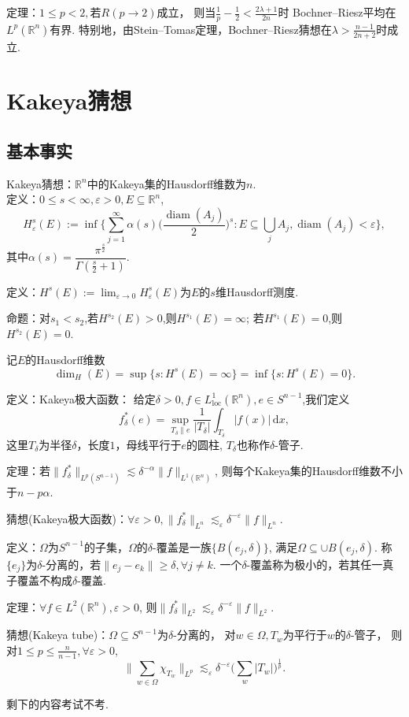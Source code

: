 定理：$1\leq p<2,$若$R(p\to 2)$成立，
则当$\frac{1}{p}-\frac{1}{2}<\frac{2\lambda+1}{2n}$时
Bochner--Riesz平均在$L^p(\mathbb{R}^n)$有界.
特别地，由Stein--Tomas定理，Bochner--Riesz猜想在$\lambda>\frac{n-1}{2n+2}$时成立.


\section{Kakeya猜想}

\subsection{基本事实}

Kakeya猜想：$\mathbb{R}^n$中的Kakeya集的Hausdorff维数为$n$.\\

定义：$0\leq s<\infty,\varepsilon >0,E \subseteq \mathbb{R}^n$,
$$H^s_\varepsilon(E)
:=\inf \bigg\{\sum_{j=1}^\infty \alpha(s)
\Big(\frac{\operatorname{diam}(A_j)}{2}\Big)^s :
E \subseteq \bigcup_{j}A_j,\operatorname{diam}(A_j)<\varepsilon\bigg\},$$
其中$\alpha(s)=\dfrac{\pi^\frac{s}{2}}{\Gamma(\frac{s}{2}+1)}$.

定义：$H^s(E):=\lim_{\varepsilon \to 0}H^s_\varepsilon (E)$为$E$的$s$维Hausdorff测度.

命题：对$s_1<s_2$,若$H^{s_2}(E)>0$,则$H^{s_1}(E)=\infty$;
若$H^{s_1}(E)=0$,则$H^{s_2}(E)=0$.

记$E$的Hausdorff维数$$\dim_{H}(E)=\sup\{s:H^s(E)=\infty\}=\inf \{ s:H^s(E)=0 \}.$$

定义：Kakeya极大函数：
给定$\delta>0,f\in L^1_{\text{loc}}(\mathbb{R}^n),e\in S^{n-1}$,我们定义
$$f^*_\delta(e)=\sup_{T_\delta\parallel e}\frac{1}{|T_\delta|}
\int_{T_\delta}|f(x)|\,\mathrm{d}x,$$
这里$T_\delta$为半径$\delta$，长度$1$，母线平行于$e$的圆柱,
$T_\delta$也称作$\delta$-管子.

定理：若$\|f^*_\delta\|_{L^p(S^{n-1})}
\lesssim \delta^{-\alpha}\|f\|_{L^1(\mathbb{R}^n)}$,
则每个Kakeya集的Hausdorff维数不小于$n-p\alpha$.

猜想(Kakeya极大函数)：$\forall \varepsilon >0, 
\|f^*_\delta\|_{L^n}\lesssim_\varepsilon \delta^{-\varepsilon}\|f\|_{L^n}.$

定义：$\Omega$为$S^{n-1}$的子集，$\Omega$的$\delta$-覆盖是一族$\{B(e_j,\delta)\}$,
满足$\Omega \subseteq \cup B(e_j,\delta)$.
称$\{ e_j \}$为$\delta$-分离的，若$\|e_j-e_k\|\geq \delta,\forall j\neq k$.
一个$\delta$-覆盖称为极小的，若其任一真子覆盖不构成$\delta$-覆盖.

定理：$\forall f\in L^2(\mathbb{R}^n),\varepsilon>0$,
则$\|f^*_\delta\|_{L^2}\lesssim_\varepsilon \delta^{-\varepsilon}\|f\|_{L^2}.$

猜想(Kakeya tube)：$\Omega \subseteq S^{n-1}$为$\delta$-分离的，
对$w\in \Omega,T_w $为平行于$w$的$\delta$-管子，
则对$1\leq p \leq \frac{n}{n-1},\forall \varepsilon >0$,
$$\Big\|\sum _{w\in \Omega}\chi_{T_w}\Big\|_{L^p}\lesssim_\varepsilon 
\delta^{-\varepsilon}\bigg(\sum_w |T_w| \bigg)^{\frac{1}{p}}.$$

剩下的内容考试不考.